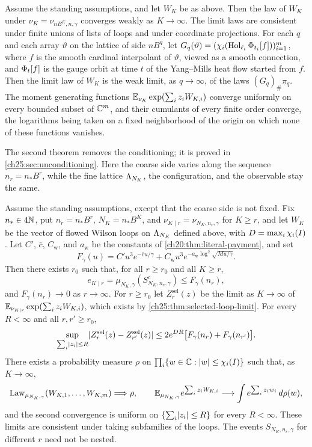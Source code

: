 \begin{theorem}\label{ch25:thm:selected-loop-limit}
Assume the standing assumptions, and let $W_K$ be as above. Then the law of $W_K$ under $\nu_K=\nu_{nB^K,n,\gamma}$ converges weakly as $K\to\infty$. The limit laws are consistent under finite unions of lists of loops and under coordinate projections. For each $q$ and each array $\vartheta$ on the lattice of side $nB^q$, let $G_q(\vartheta)=(\chi_i(\operatorname{Hol}_{\ell_i}\Phi_{t_i}[f]))_{i=1}^m$, where $f$ is the smooth cardinal interpolant of $\vartheta$, viewed as a smooth connection, and $\Phi_t[f]$ is the gauge orbit at time $t$ of the Yang--Mills heat flow started from $f$. Then the limit law of $W_K$ is the weak limit, as $q\to\infty$, of the laws $(G_q)_\#\pi_q$. The moment generating functions $\mathbb E_{\nu_K}\exp(\sum_iz_iW_{K,i})$ converge uniformly on every bounded subset of $\mathbb C^m$, and their cumulants of every finite order converge, the logarithms being taken on a fixed neighborhood of the origin on which none of these functions vanishes.
\end{theorem}

The second theorem removes the conditioning; it is proved in \cref{ch25:sec:unconditioning}. Here the coarse side varies along the sequence $n_r=n_*B^r$, while the fine lattice $\Lambda_{N_K}$, the configuration, and the observable stay the same.

\begin{theorem}\label{ch25:thm:original-loop-stitching}
Assume the standing assumptions, except that the coarse side is not fixed. Fix $n_*\in4\mathbb N$, put $n_r=n_*B^r$, $N_K=n_*B^K$, and $\nu_{K\mid r}=\nu_{N_K,n_r,\gamma}$ for $K\ge r$, and let $W_K$ be the vector of flowed Wilson loops on $\Lambda_{N_K}$ defined above, with $D=\max_i\chi_i(I)$. Let $C'$, $\bar c$, $C_{\mathrm w}$, and $a_{\mathrm w}$ be the constants of \cref{ch20:thm:literal-payment}, and set
\[
 F_\gamma(u)=C'u^3e^{-\bar cu/\gamma}+C_{\mathrm w}u^3e^{-a_{\mathrm w}\log^2\sqrt{Mu/\gamma}}.
\]
Then there exists $r_0$ such that, for all $r\ge r_0$ and all $K\ge r$,
\[
 e_{K\mid r}=\mu_{N_K,\gamma}(S_{N_K,n_r,\gamma}^c)\le F_\gamma(n_r),
\]
and $F_\gamma(n_r)\to0$ as $r\to\infty$. For $r\ge r_0$ let $Z_r^{\mathrm{sel}}(z)$ be the limit as $K\to\infty$ of $\mathbb E_{\nu_{K\mid r}}\exp(\sum_iz_iW_{K,i})$, which exists by \cref{ch25:thm:selected-loop-limit}. For every $R<\infty$ and all $r,r'\ge r_0$,
\[
 \sup_{\sum_i\lvert z_i\rvert\le R}\lvert Z_r^{\mathrm{sel}}(z)-Z_{r'}^{\mathrm{sel}}(z)\rvert\le2e^{DR}\bigl[F_\gamma(n_r)+F_\gamma(n_{r'})\bigr].
\]
There exists a probability measure $\rho$ on $\prod_i\{w\in\mathbb C:\lvert w\rvert\le\chi_i(I)\}$ such that, as $K\to\infty$,
\[
 \operatorname{Law}_{\mu_{N_K,\gamma}}(W_{K,1},\ldots,W_{K,m})\Longrightarrow\rho,\qquad
 \mathbb E_{\mu_{N_K,\gamma}}e^{\sum_iz_iW_{K,i}}\longrightarrow\int e^{\sum_iz_iw_i}\,d\rho(w),
\]
and the second convergence is uniform on $\{\sum_i\lvert z_i\rvert\le R\}$ for every $R<\infty$. These limits are consistent under taking subfamilies of the loops. The events $S_{N_K,n_r,\gamma}$ for different $r$ need not be nested.
\end{theorem}

